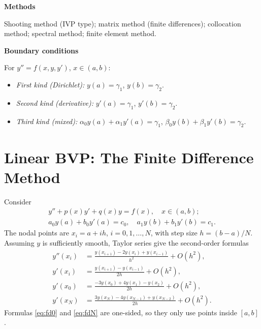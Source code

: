 \documentclass[11pt,a4paper]{article}
\numberwithin{equation}{section}
\theoremstyle{spacedplain}
\theoremstyle{spaceddefinition}
\theoremstyle{spacedremark}
\newcommand{\step}[1]{\par\addvspace{0.6em}\noindent\textbf{#1}\par\nobreak}
\begin{document}
\step{Methods}
Shooting method (IVP type); matrix method (finite
differences); collocation method; spectral method; finite element
method.

\step{Boundary conditions}
For \(y''=f(x,y,y')\), \(x\in(a,b)\):
\begin{itemize}
  \item \emph{First kind (Dirichlet):} \(y(a)=\gamma_1\),
    \(y(b)=\gamma_2\).
  \item \emph{Second kind (derivative):} \(y'(a)=\gamma_1\),
    \(y'(b)=\gamma_2\).
  \item \emph{Third kind (mixed):}
    \(\alpha_0y(a)+\alpha_1y'(a)=\gamma_1\),
    \(\beta_0y(b)+\beta_1y'(b)=\gamma_2\).
\end{itemize}

\section{Linear BVP: The Finite Difference Method}

Consider
\begin{equation}\label{eq:linbvp}
\begin{gathered}
  y''+p(x)y'+q(x)y=f(x),\quad x\in(a,b);
  \\
  a_0y(a)+b_0y'(a)=c_0,\quad a_1y(b)+b_1y'(b)=c_1.
\end{gathered}
\end{equation}
The nodal points are \(x_i=a+ih\), \(i=0,1,\dots,N\), with step size
\(h=(b-a)/N\).  Assuming \(y\) is sufficiently smooth, Taylor series
give the second-order formulas
\begin{align}
  y''(x_i)&=\frac{y(x_{i+1})-2y(x_i)+y(x_{i-1})}{h^2}+O(h^2),
    \label{eq:fd2}\\
  y'(x_i)&=\frac{y(x_{i+1})-y(x_{i-1})}{2h}+O(h^2),
    \label{eq:fd1}\\
  y'(x_0)&=\frac{-3y(x_0)+4y(x_1)-y(x_2)}{2h}+O(h^2),
    \label{eq:fd0}\\
  y'(x_N)&=\frac{3y(x_N)-4y(x_{N-1})+y(x_{N-2})}{2h}+O(h^2).
    \label{eq:fdN}
\end{align}
Formulas \eqref{eq:fd0} and \eqref{eq:fdN} are one-sided, so they only
use points inside \([a,b]\).
\end{document}
